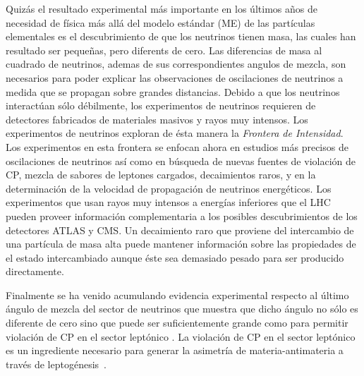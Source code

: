 Quizás el resultado experimental más importante en los últimos años de
necesidad de física más allá del modelo estándar (ME) de las
partículas elementales es el descubrimiento de que los neutrinos
tienen masa, las cuales han resultado ser pequeñas, pero diferents
de cero. Las diferencias de masa al cuadrado de neutrinos, ademas de sus correspondientes angulos de mezcla, son necesarios para poder explicar las observaciones de
oscilaciones de neutrinos a medida que se propagan sobre grandes
distancias. Debido a que los neutrinos interactúan sólo débilmente,
los experimentos de neutrinos requieren de detectores fabricados de
materiales masivos y rayos muy intensos. Los experimentos de neutrinos
exploran de ésta manera la \emph{Frontera de Intensidad}. Los experimentos en
esta frontera se enfocan ahora en estudios más precisos de
oscilaciones de neutrinos así como en búsqueda de nuevas fuentes de
violación de CP, mezcla de sabores de leptones cargados, decaimientos
raros, y en la determinación de la velocidad de propagación de
neutrinos energéticos. Los experimentos que usan rayos muy intensos a
energías inferiores que el LHC pueden proveer información
complementaria a los posibles descubrimientos de los detectores ATLAS
y CMS. Un decaimiento raro que proviene del intercambio de una
partícula de masa alta puede mantener información sobre las
propiedades de el estado intercambiado aunque éste sea demasiado
pesado para ser producido directamente.

Finalmente se ha venido acumulando evidencia experimental respecto al
último ángulo de mezcla del sector de neutrinos que muestra que dicho
ángulo no sólo es diferente de cero sino que puede ser suficientemente
grande como para permitir violación de CP en el sector leptónico
\cite{valle}. La violación de CP en el sector leptónico es un
ingrediente necesario para generar la asimetría de materia-antimateria
a través de leptogénesis~\cite{Davidson:2008bu}.


